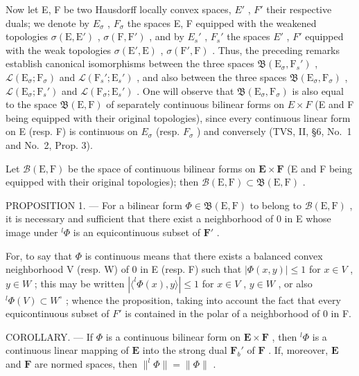 Now let E, F be two Hausdorff locally convex spaces, \(E'\) , \(F'\) their respective duals; we denote by \(E_{\sigma}\) , \(F_{\sigma}\) the spaces E, F equipped with the weakened topologies \(\sigma(\mathrm{E}, \mathrm{E}')\) , \(\sigma(\mathrm{F}, \mathrm{F}')\) , and by \(E_{s}'\) , \(F_{s}'\) the spaces \(E'\) , \(F'\) equipped with the weak topologies \(\sigma(\mathrm{E}', \mathrm{E})\) , \(\sigma(\mathrm{F}', \mathrm{F})\) . Thus, the preceding remarks establish canonical isomorphisms between the three spaces \(\mathfrak{B}(\mathrm{E}_{\sigma}, \mathrm{F}_{s}')\) , \(\mathcal{L}(\mathrm{E}_{\sigma}; \mathrm{F}_{\sigma})\) and \(\mathcal{L}(\mathrm{F}_{s}'; \mathrm{E}_{s}')\) , and also between the three spaces \(\mathfrak{B}(\mathrm{E}_{\sigma}, \mathrm{F}_{\sigma})\) , \(\mathcal{L}(\mathrm{E}_{\sigma}; \mathrm{F}_{s}')\) and \(\mathcal{L}(\mathrm{F}_{\sigma}; \mathrm{E}_{s}')\) . One will observe that \(\mathfrak{B}(\mathrm{E}_{\sigma}, \mathrm{F}_{\sigma})\) is also equal to the space \(\mathfrak{B}(\mathrm{E}, \mathrm{F})\) of separately continuous bilinear forms on \(E \times F\) (E and F being equipped with their original topologies), since every continuous linear form on E (resp. F) is continuous on \(E_{\sigma}\) (resp. \(F_{\sigma}\) ) and conversely (TVS, II, §6, No.~1 and No.~2, Prop. 3).

Let \(\mathcal{B}(\mathrm{E},\mathrm{F})\) be the space of continuous bilinear forms on \(\mathbf{E}\times \mathbf{F}\) (E and F being equipped with their original topologies); then \(\mathcal{B}(\mathrm{E},\mathrm{F})\subset \mathfrak{B}(\mathrm{E},\mathrm{F})\) .

PROPOSITION 1. --- For a bilinear form \(\Phi \in \mathfrak{B}(\mathrm{E},\mathrm{F})\) to belong to \(\mathcal{B}(\mathrm{E},\mathrm{F})\) , it is necessary and sufficient that there exist a neighborhood of 0 in E whose image under \(^l\Phi\) is an equicontinuous subset of \(\mathbf{F}'\) .

For, to say that \(\Phi\) is continuous means that there exists a balanced convex neighborhood V (resp. W) of 0 in E (resp. F) such that \(|\Phi(x,y)| \leqslant 1\) for \(x \in V\) , \(y \in W\) ; this may be written \(|\langle^{l}\Phi(x), y \rangle| \leqslant 1\) for \(x \in V\) , \(y \in W\) , or also \(^{l}\Phi(V) \subset W^{\circ}\) ; whence the proposition, taking into account the fact that every equicontinuous subset of \(F'\) is contained in the polar of a neighborhood of 0 in F.

COROLLARY. --- If \(\Phi\) is a continuous bilinear form on \(\mathbf{E} \times \mathbf{F}\) , then \(^l\Phi\) is a continuous linear mapping of \(\mathbf{E}\) into the strong dual \(\mathbf{F}_b'\) of \(\mathbf{F}\) . If, moreover, \(\mathbf{E}\) and \(\mathbf{F}\) are normed spaces, then \(\|^l\Phi\| = \| \Phi \|\) .

